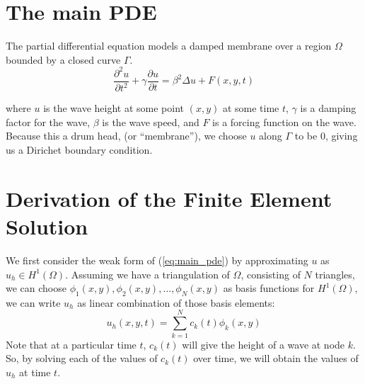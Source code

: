 \documentclass[a4paper,12pt]{article}
\begin{document}
\section{The main PDE}
The partial differential equation models a damped membrane over a region $\Omega$ bounded by a closed curve $\Gamma$.
\begin{equation} \label{eq:main_pde}
\frac{\partial^2u}{\partial t^2} + \gamma \frac{\partial u}{\partial t}
=
\beta^2 \Delta u + F(x,y,t)
\end{equation}

where $u$ is the wave height at some point $(x,y)$ at some time $t$, $\gamma$ is a damping factor for the wave,
$\beta$ is the wave speed, and $F$ is a forcing function on the wave. Because this a drum head, (or ``membrane''), we choose
$u$ along $\Gamma$ to be 0, giving us a Dirichet boundary condition.

\section{Derivation of the Finite Element Solution}
We first consider the weak form of (\ref{eq:main_pde}) by approximating $u$ as $u_h \in H^1(\Omega)$. Assuming we have
a triangulation of $\Omega$, consisting of $N$ triangles, we can choose 
$\phi_1(x,y), \phi_2(x,y), \ldots, \phi_N(x,y)$ as basis functions for $H^1(\Omega)$, we can write $u_h$ as linear
combination of those basis elements:
\begin{equation} \label{eq:u_h}
u_h(x,y,t) = \sum\limits_{k=1}^N c_k(t) \phi_k(x,y)
\end{equation}
Note that at a particular time $t$, $c_k(t)$ will give the height of a wave at node $k$. So, by solving each of the values
of $c_k(t)$ over time, we will obtain the values of $u_h$ at time $t$.
\end{document}
